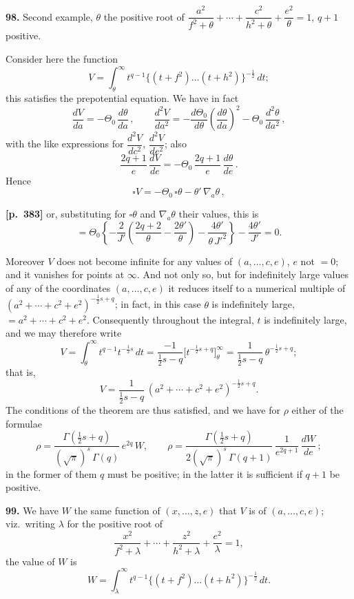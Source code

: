 \documentclass[11pt,a4paper]{article}
\begin{document}
\textbf{98.} Second example, $\theta$ the positive root of $\dfrac{a^{2}}{f^{2}+\theta} + \cdots + \dfrac{c^{2}}{h^{2}+\theta} + \dfrac{e^{2}}{\theta} = 1$, $q+1$ positive.

Consider here the function
\[
V = \int_{\theta}^{\infty} t^{q-1}\bigl\{(t+f^{2})\ldots(t+h^{2})\bigr\}^{-\tfrac{1}{2}}\,dt;
\]
this satisfies the prepotential equation. We have in fact
\[
\frac{dV}{da} = -\Theta_{0}\,\frac{d\theta}{da}\,,\qquad
\frac{d^{2}V}{da^{2}} = -\frac{d\Theta_{0}}{d\theta}\left(\frac{d\theta}{da}\right)^{2} - \Theta_{0}\,\frac{d^{2}\theta}{da^{2}}\,,
\]
with the like expressions for $\dfrac{d^{2}V}{dc^{2}}$, $\dfrac{d^{2}V}{de^{2}}$; also
\[
\frac{2q+1}{e}\,\frac{dV}{de} = -\Theta_{0}\,\frac{2q+1}{e}\,\frac{d\theta}{de}\,.
\]
Hence
\[
\square V = -\Theta_{0}\,\square\theta - \theta'\,\nabla_{a}\theta\,,
\]

\noindent\textbf{[p.~383]}\quad
or, substituting for $\square\theta$ and $\nabla_{a}\theta$ their values, this is
\[
= \Theta_{0}\left\{ -\frac{2}{J'}\left( \frac{2q+2}{\theta} - \frac{2\theta'}{\theta} \right) - \frac{4\theta'}{\theta\,J'^{2}} \right\} - \frac{4\theta'}{J'} = 0.
\]

Moreover $V$ does not become infinite for any values of $(a,\ldots, c, e)$, $e$ not $= 0$; and it vanishes for points at $\infty$. And not only so, but for indefinitely large values of any of the coordinates $(a, \ldots, c, e)$ it reduces itself to a numerical multiple of $(a^{2} + \cdots + c^{2} + e^{2})^{-\tfrac{1}{2}s+q}$; in fact, in this case $\theta$ is indefinitely large, $= a^{2} + \cdots + c^{2} + e^{2}$. Consequently throughout the integral, $t$ is indefinitely large, and we may therefore write
\[
V = \int_{\theta}^{\infty} t^{q-1} t^{-\tfrac{1}{2}s}\,dt
= \frac{-1}{\tfrac{1}{2}s - q}\bigl[t^{-\tfrac{1}{2}s + q}\bigr]_{\theta}^{\infty}
= \frac{1}{\tfrac{1}{2}s - q}\,\theta^{-\tfrac{1}{2}s + q};
\]
that is,
\[
V = \frac{1}{\tfrac{1}{2}s - q}\,(a^{2} + \cdots + c^{2} + e^{2})^{-\tfrac{1}{2}s + q}.
\]
The conditions of the theorem are thus satisfied, and we have for $\rho$ either of the formulae
\[
\rho = \frac{\Gamma(\tfrac{1}{2}s + q)}{(\sqrt{\pi})^{s}\,\Gamma(q)}\, e^{2q}\,W,\qquad
\rho = \frac{\Gamma(\tfrac{1}{2}s + q)}{2(\sqrt{\pi})^{s}\,\Gamma(q+1)}\,\frac{1}{e^{2q+1}}\,\frac{dW}{de}\,;
\]
in the former of them $q$ must be positive; in the latter it is sufficient if $q + 1$ be positive.

\textbf{99.} We have $W$ the same function of $(x, \ldots, z, e)$ that $V$ is of $(a, \ldots, c, e)$; viz.\ writing $\lambda$ for the positive root of
\[
\frac{x^{2}}{f^{2}+\lambda} + \cdots + \frac{z^{2}}{h^{2}+\lambda} + \frac{e^{2}}{\lambda} = 1,
\]
the value of $W$ is
\[
W = \int_{\lambda}^{\infty} t^{q-1}\bigl\{(t+f^{2})\ldots(t+h^{2})\bigr\}^{-\tfrac{1}{2}}\,dt.
\]
\end{document}
